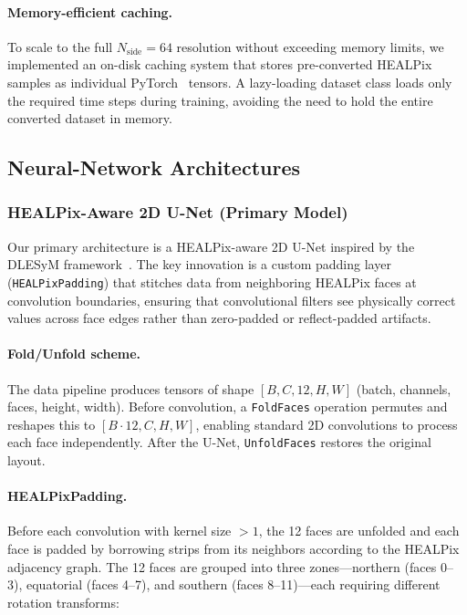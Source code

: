 \documentclass[11pt, a4paper, twocolumn]{article}
\begin{document}
\paragraph{Memory-efficient caching.} To scale to the full $N_\text{side} = 64$ resolution without exceeding memory limits, we implemented an on-disk caching system that stores pre-converted HEALPix samples as individual PyTorch~\cite{paszke2019pytorch} tensors. A lazy-loading dataset class loads only the required time steps during training, avoiding the need to hold the entire converted dataset in memory.

\subsection{Neural-Network Architectures}

\subsubsection{HEALPix-Aware 2D U-Net (Primary Model)}

Our primary architecture is a HEALPix-aware 2D U-Net inspired by the DLESyM framework~\cite{wattmeyer2024}. The key innovation is a custom padding layer (\texttt{HEALPixPadding}) that stitches data from neighboring HEALPix faces at convolution boundaries, ensuring that convolutional filters see physically correct values across face edges rather than zero-padded or reflect-padded artifacts.

\paragraph{Fold/Unfold scheme.} The data pipeline produces tensors of shape $[B, C, 12, H, W]$ (batch, channels, faces, height, width). Before convolution, a \texttt{FoldFaces} operation permutes and reshapes this to $[B{\cdot}12, C, H, W]$, enabling standard 2D convolutions to process each face independently. After the U-Net, \texttt{UnfoldFaces} restores the original layout.

\paragraph{HEALPixPadding.} Before each convolution with kernel size $> 1$, the 12 faces are unfolded and each face is padded by borrowing strips from its neighbors according to the HEALPix adjacency graph. The 12 faces are grouped into three zones---northern (faces 0--3), equatorial (faces 4--7), and southern (faces 8--11)---each requiring different rotation transforms:
\end{document}
